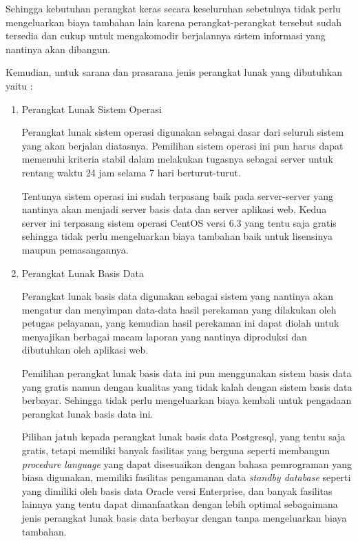 \documentclass[pdftex,12pt, oneside]{article}
\begin{document}
Sehingga kebutuhan perangkat keras secara keseluruhan sebetulnya tidak perlu mengeluarkan biaya tambahan lain karena perangkat-perangkat tersebut sudah tersedia dan cukup untuk mengakomodir berjalannya sistem informasi yang nantinya akan dibangun.

Kemudian, untuk sarana dan prasarana jenis perangkat lunak yang dibutuhkan yaitu :

\begin{enumerate}[1.]
  \item Perangkat Lunak Sistem Operasi
  
Perangkat lunak sistem operasi digunakan sebagai dasar dari seluruh sistem yang akan berjalan diatasnya. Pemilihan sistem operasi ini pun harus dapat memenuhi kriteria stabil dalam melakukan tugasnya sebagai server untuk rentang waktu 24 jam selama 7 hari berturut-turut.

Tentunya sistem operasi ini sudah terpasang baik pada server-server yang nantinya akan menjadi server basis data dan server aplikasi web. Kedua server ini terpasang sistem operasi CentOS versi 6.3 yang tentu saja gratis sehingga tidak perlu mengeluarkan biaya tambahan baik untuk lisensinya maupun pemasangannya.

  \item Perangkat Lunak Basis Data
  
Perangkat lunak basis data digunakan sebagai sistem yang nantinya akan mengatur dan menyimpan data-data hasil perekaman yang dilakukan oleh petugas pelayanan, yang kemudian hasil perekaman ini dapat diolah untuk menyajikan berbagai macam laporan yang nantinya diproduksi dan dibutuhkan oleh aplikasi web.

Pemilihan perangkat lunak basis data ini pun menggunakan sistem basis data yang gratis namun dengan kualitas yang tidak kalah dengan sistem basis data berbayar. Sehingga tidak perlu mengeluarkan biaya kembali untuk pengadaan perangkat lunak basis data ini. 

Pilihan jatuh kepada perangkat lunak basis data Postgresql, yang tentu saja gratis, tetapi memiliki banyak fasilitas yang berguna seperti membangun \textit{procedure language} yang dapat disesuaikan dengan bahasa pemrograman yang biasa digunakan, memiliki fasilitas pengamanan data \textit{standby database} seperti yang dimiliki oleh basis data Oracle versi Enterprise, dan banyak fasilitas lainnya yang tentu dapat dimanfaatkan dengan lebih optimal sebagaimana jenis perangkat lunak basis data berbayar dengan tanpa mengeluarkan biaya tambahan.
  

\end{enumerate}
\end{document}
